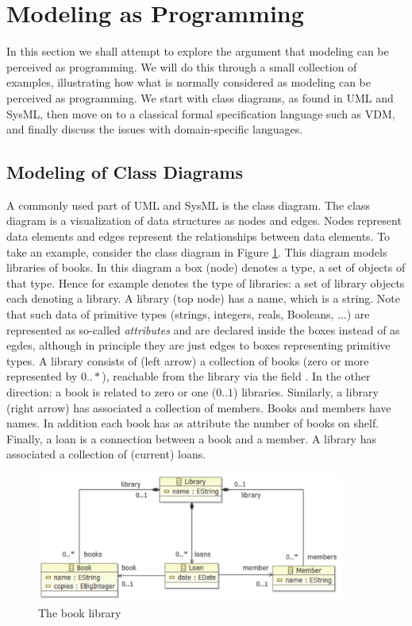
\section{Modeling as Programming}
\label{sec:modeling-as-programming}

In this section we shall attempt to explore the argument that
modeling can be perceived as programming. We will do this through
a small collection of examples, illustrating how what is normally
considered as modeling can be perceived as programming. We start
with class diagrams, as found in UML and SysML, then move on to
a classical formal specification language such as VDM, and finally discuss the issues with domain-specific languages.

\subsection{Modeling of Class Diagrams}
\label{sec:complex-classes-in-scala}

A commonly used part of UML and SysML is the class diagram. The class diagram is a visualization of data structures as nodes and edges. Nodes represent data elements and edges represent the relationships between data elements. To take an
example, consider the class diagram in Figure \ref{fig:library}.
This diagram models libraries of books. In this diagram a box (node) denotes a type, a set of objects of that type. Hence
for example  denotes the type of libraries: a set
of library objects each denoting a library.
A library (top node) has a name, which is a string. Note that
such data of primitive types (strings, integers, reals, Booleans, ...) are represented as so-called {\em attributes} and are declared inside the boxes instead of as egdes, although in principle they are just edges to boxes representing primitive types. A library consists of (left arrow) 
a collection of books (zero or more represented by $0 .. *$),
reachable from the library via the field . In the other direction: a book is related to zero or one ($0 .. 1$) libraries.
Similarly, a library (right arrow) has associated a collection of
members. Books and members have names. In addition each book has as
attribute the number of books on shelf. Finally, a loan is a connection between a book and a member. A library has associated
a collection of (current) loans.

\begin{figure}[ht]
\centering
\includegraphics[width=0.9\textwidth]{images/library.png}
\caption{The book library}
\label{fig:library}
\end{figure}

